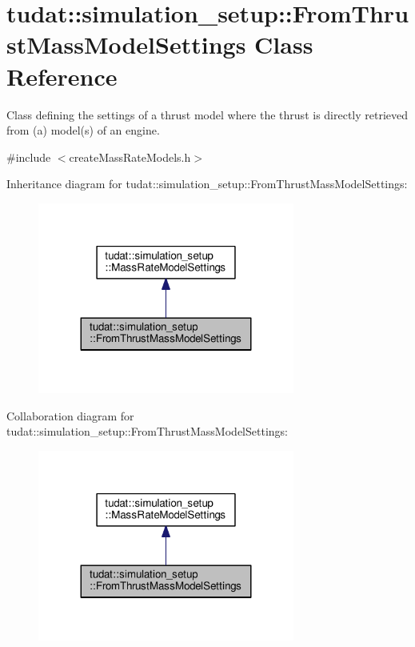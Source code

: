 \hypertarget{classtudat_1_1simulation__setup_1_1FromThrustMassModelSettings}{}\section{tudat\+:\+:simulation\+\_\+setup\+:\+:From\+Thrust\+Mass\+Model\+Settings Class Reference}
\label{classtudat_1_1simulation__setup_1_1FromThrustMassModelSettings}


Class defining the settings of a thrust model where the thrust is directly retrieved from (a) model(s) of an engine.  




{\ttfamily \#include $<$create\+Mass\+Rate\+Models.\+h$>$}



Inheritance diagram for tudat\+:\+:simulation\+\_\+setup\+:\+:From\+Thrust\+Mass\+Model\+Settings\+:
\nopagebreak
\begin{figure}[H]
\begin{center}
\leavevmode
\includegraphics[width=239pt]{classtudat_1_1simulation__setup_1_1FromThrustMassModelSettings__inherit__graph}
\end{center}
\end{figure}


Collaboration diagram for tudat\+:\+:simulation\+\_\+setup\+:\+:From\+Thrust\+Mass\+Model\+Settings\+:
\nopagebreak
\begin{figure}[H]
\begin{center}
\leavevmode
\includegraphics[width=239pt]{classtudat_1_1simulation__setup_1_1FromThrustMassModelSettings__coll__graph}
\end{center}
\end{figure}
